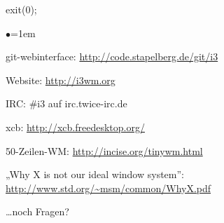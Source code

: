 \documentclass[mode=print,paper=screen,style=jefka]{powerdot}
\begin{document}
\begin{slide}{exit(0);}
\begin{list}{$\bullet$}{\itemsep=1em}
        \item git-webinterface: \url{http://code.stapelberg.de/git/i3}
        \item Website: \url{http://i3wm.org}
        \item IRC: \#i3 auf irc.twice-irc.de
        \item xcb: \url{http://xcb.freedesktop.org/}
        \item 50-Zeilen-WM: \url{http://incise.org/tinywm.html}
        \item „Why X is not our ideal window system”: \url{http://www.std.org/~msm/common/WhyX.pdf}
        \item …noch Fragen?
\end{list}
\end{slide}
\end{document}
